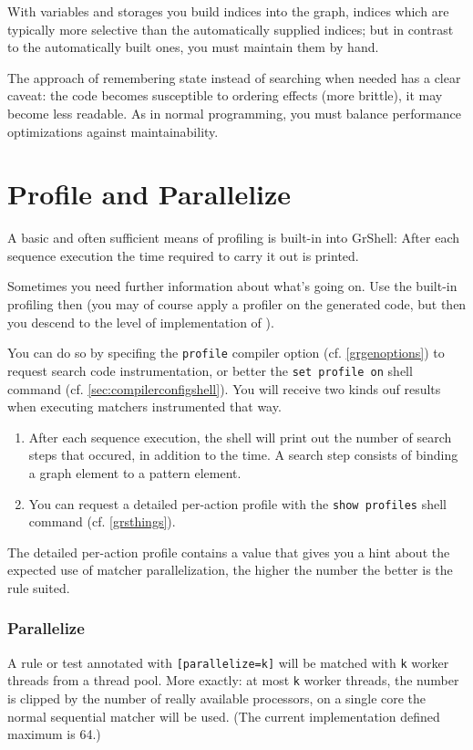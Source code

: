 With variables and storages you build indices into the graph, indices which are typically more selective than the automatically supplied indices; 
but in contrast to the automatically built ones, you must maintain them by hand.

The approach of remembering state instead of searching when needed has a clear caveat: the code becomes susceptible to ordering effects (more brittle), it may become less readable. As in normal programming, you must balance performance optimizations against maintainability.


\section{Profile and Parallelize}\label{sec:performanceparallel}

A basic and often sufficient means of profiling is built-in into GrShell:
After each sequence execution the time required to carry it out is printed.

Sometimes you need further information about what's going on.
Use the built-in profiling then (you may of course apply a profiler on the generated code, but then you descend to the level of implementation of \GrG).

You can do so by specifing the \texttt{profile} compiler option (cf. \ref{grgenoptions}) to request search code instrumentation, or better the \texttt{set profile on} shell command (cf. \ref{sec:compilerconfigshell}).
You will receive two kinds ouf results when executing matchers instrumented that way.

\begin{enumerate}
	\item After each sequence execution, the shell will print out the number of search steps that occured, in addition to the time. A search step consists of binding a graph element to a pattern element.
	\item You can request a detailed per-action profile with the \texttt{show profiles} shell command (cf. \ref{grsthings}).
\end{enumerate}

The detailed per-action profile contains a value that gives you a hint about the expected use of matcher parallelization, the higher the number the better is the rule suited.

\subsubsection*{Parallelize}
A rule or test annotated with \texttt{[parallelize=k]} will be matched with \texttt{k} worker threads from a thread pool.
More exactly: at most \texttt{k} worker threads, the number is clipped by the number of really available processors, on a single core the normal sequential matcher will be used.
(The current implementation defined maximum is 64.)

